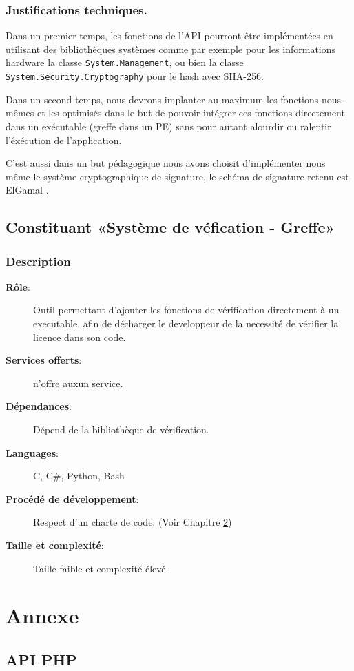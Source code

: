 \subsection{Justifications techniques.}
Dans un premier temps, les fonctions de l'API pourront être implémentées en utilisant des bibliothèques systèmes comme par exemple pour les informations hardware la 
classe \verb:System.Management:, ou bien la classe \verb:System.Security.Cryptography: 
pour le hash avec SHA-256.\newline

Dans un second temps, nous devrons implanter au maximum les fonctions nous-mêmes et 
les optimisés dans le but de pouvoir intégrer ces fonctions directement dans un 
exécutable (greffe dans un PE) sans pour autant alourdir ou ralentir l'éxécution de 
l'application. \newline

C'est aussi dans un but pédagogique nous avons choisit d'implémenter nous même le système cryptographique de signature, le schéma de signature retenu est ElGamal \cite{ElGamal}.

\section{Constituant «Système de véfication - Greffe»}
\subsection{Description}
\begin{description}
	\item[\textbf{Rôle}:]
			Outil permettant d'ajouter les fonctions de vérification directement à un
			executable, afin de décharger le developpeur de la necessité de vérifier 
			la licence dans son code.
	\item[\textbf{Services offerts}:]
		n'offre auxun service.
	\item[\textbf{Dépendances}:]
		Dépend de la bibliothèque de vérification.
	\item[\textbf{Languages}:]
		C, C\#, Python, Bash 
	\item[\textbf{Procédé de développement}:]
		Respect d'un charte de code. (Voir Chapitre \ref{chap:Annexe}) 
	\item[\textbf{Taille et complexité}:]
		Taille faible et complexité élevé.
\end{description}


\chapter{Annexe}
\label{chap:Annexe}



\section{API PHP}
\label{section:php}
\inputminted{php}{api.php}